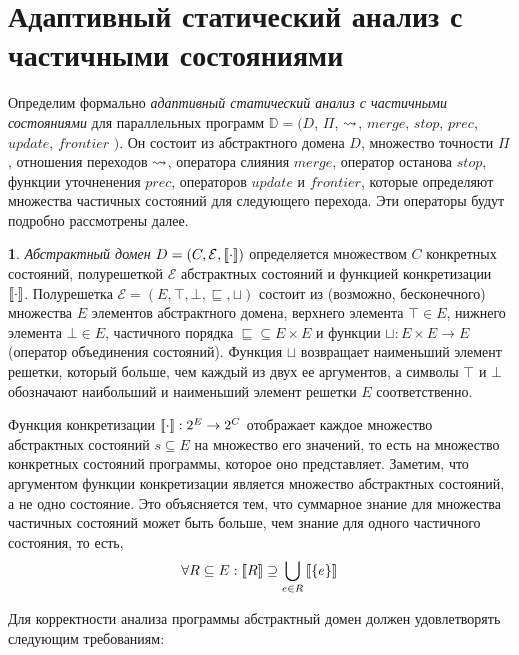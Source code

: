 

\section{Адаптивный статический анализ с частичными состояниями}
\label{sect_cpata}

\newcommand{\update}{update}
\newcommand{\frontier}{frontier}

Определим формально \emph{адаптивный статический анализ с частичными состояниями} для параллельных программ $\mathbb{D}=(D$, $\Pi$, $\leadsto$, $merge$, $stop$, $prec$, $\update$, $\frontier$ $)$.
Он состоит из абстрактного домена $D$, 
множество точности $\Pi$, 
отношения переходов $\leadsto$,
оператора слияния $merge$, оператор останова $stop$, функции уточненения $prec$, 
операторов $\update$ и $\frontier$, которые определяют множества частичных состояний для следующего перехода.
Эти операторы будут подробно рассмотрены далее.

{\textbf 1.} \emph{Абстрактный домен}  $D=(C, \mathcal{E},[\![ \cdot ]\!])$ определяется множеством $C$ конкретных состояний, полурешеткой $\mathcal{E}$ абстрактных состояний и функцией конкретизации $[\![ \cdot ]\!]$.
Полурешетка 
$\mathcal{E}=(E, \top, \bot, \sqsubseteq, \sqcup)$ состоит из (возможно, бесконечного) множества $E$ элементов абстрактного домена, верхнего элемента $\top \in E$, нижнего элемента $\bot \in E$, частичного порядка $\sqsubseteq \subseteq E \times E$ и функции $\sqcup:E \times E \rightarrow E$ (оператор объединения состояний).
Функция $\sqcup$ возвращает наименьший элемент решетки, который больше, чем каждый из двух ее аргументов, а символы $\top$ и $\bot$ обозначают наибольший и наименьший элемент решетки $E$ соответственно. 

Функция конкретизации $[\![ \cdot ]\!]: 2^E \rightarrow 2^C$ отображает каждое множество абстрактных состояний $s \subseteq E$ на множество его значений, то есть на множество конкретных состояний программы, которое оно представляет.
Заметим, что аргументом функции конкретизации является множество абстрактных состояний, а не одно состояние.
Это объясняется тем, что суммарное знание для множества частичных состояний может быть больше, чем знание для одного частичного состояния, то есть,  
$$\forall R\subseteq E: [\![ R ]\!] \supseteq \bigcup_{e\in R}{[\![ \{e\} ]\!]}$$

Для корректности анализа программы абстрактный домен должен удовлетворять следующим требованиям:

